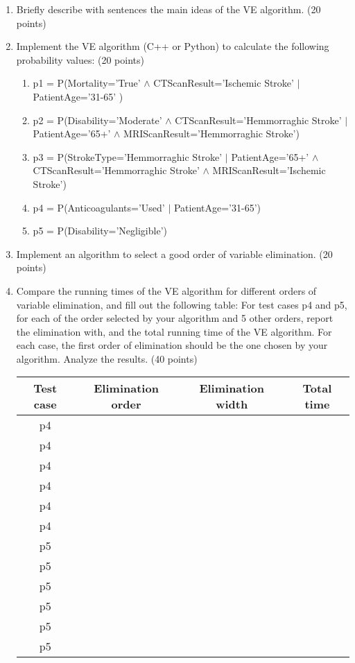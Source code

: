 \documentclass[a4paper, 11pt]{article}
\begin{document}
\begin{enumerate}
\item Briefly describe with sentences the main ideas of  the VE algorithm. (20 points)

\item Implement the VE algorithm (C++ or Python) to calculate the following probability values: (20 points)
    
\begin{enumerate}
\item p1 = P(Mortality='True' $\land$ CTScanResult='Ischemic Stroke' $|$ PatientAge='31-65' )

\item p2 = P(Disability='Moderate' $\land$ CTScanResult='Hemmorraghic Stroke' $|$ PatientAge='65+' $\land$  MRIScanResult='Hemmorraghic Stroke')

\item p3 = P(StrokeType='Hemmorraghic Stroke' $|$ PatientAge='65+' $\land$ CTScanResult='Hemmorraghic Stroke' $\land$ MRIScanResult='Ischemic Stroke')

\item p4 = P(Anticoagulants='Used' $|$ PatientAge='31-65')

\item p5 = P(Disability='Negligible')
\end{enumerate}


\item Implement an algorithm to select a good order of variable elimination. (20 points)


\item Compare the running times of the VE algorithm for different orders of variable elimination, and fill out the following table: For test cases p4 and p5, for each of the order selected by your algorithm and 5 other orders, report the elimination with, and the total running time of the VE algorithm. For each case, the first order of elimination should be the one chosen by your algorithm. Analyze the results. (40 points)
    

    \begin{tabular}{|c|c|c|c|}
\hline
Test case                                                                                             & Elimination order & Elimination width  & Total time \\ \hline
p4  & &  &            \\ \hline
p4  & &  &            \\ \hline
p4  & &  &            \\ \hline
p4  & &  &            \\ \hline
p4  & &  &            \\ \hline
p4  & &  &            \\ \hline
p5  & &  &            \\ \hline
p5  & &  &            \\ \hline
p5  & &  &            \\ \hline
p5  & &  &            \\ \hline
p5  & &  &            \\ \hline
p5  & &  &            \\ \hline
\end{tabular} 
\end{enumerate}
\end{document}
